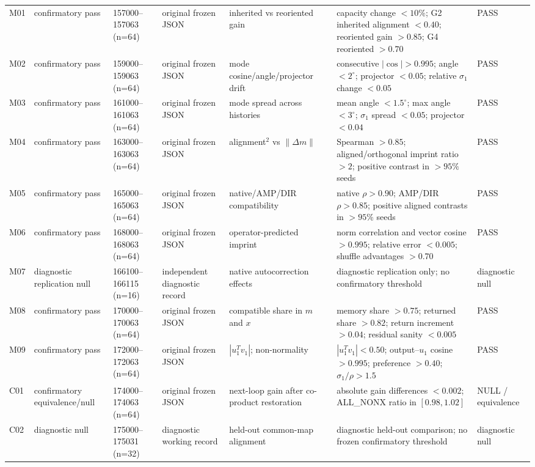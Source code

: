 \documentclass[11pt]{article}
\begin{document}
\begin{landscape}
\begin{longtable}{p{0.65cm}p{2.25cm}p{2.55cm}p{3.15cm}p{3.9cm}p{6.1cm}p{2.2cm}}
M01 & confirmatory pass & 157000--157063 (n=64) & original frozen JSON & inherited vs reoriented gain & capacity change $<10\%$; G2 inherited alignment $<0.40$; reoriented gain $>0.85$; G4 reoriented $>0.70$ & PASS \\
M02 & confirmatory pass & 159000--159063 (n=64) & original frozen JSON & mode cosine/angle/projector drift & consecutive $|\cos|>0.995$; angle $<2^\circ$; projector $<0.05$; relative $\sigma_1$ change $<0.05$ & PASS \\
M03 & confirmatory pass & 161000--161063 (n=64) & original frozen JSON & mode spread across histories & mean angle $<1.5^\circ$; max angle $<3^\circ$; $\sigma_1$ spread $<0.05$; projector $<0.04$ & PASS \\
M04 & confirmatory pass & 163000--163063 (n=64) & original frozen JSON & alignment$^2$ vs $\|\Delta m\|$ & Spearman $>0.85$; aligned/orthogonal imprint ratio $>2$; positive contrast in $>95\%$ seeds & PASS \\
M05 & confirmatory pass & 165000--165063 (n=64) & original frozen JSON & native/AMP/DIR compatibility & native $\rho>0.90$; AMP/DIR $\rho>0.85$; positive aligned contrasts in $>95\%$ seeds & PASS \\
M06 & confirmatory pass & 168000--168063 (n=64) & original frozen JSON & operator-predicted imprint & norm correlation and vector cosine $>0.995$; relative error $<0.005$; shuffle advantages $>0.70$ & PASS \\
M07 & diagnostic replication null & 166100--166115 (n=16) & independent diagnostic record & native autocorrection effects & diagnostic replication only; no confirmatory threshold & diagnostic null \\
M08 & confirmatory pass & 170000--170063 (n=64) & original frozen JSON & compatible share in $m$ and $x$ & memory share $>0.75$; returned share $>0.82$; return increment $>0.04$; residual sanity $<0.005$ & PASS \\
M09 & confirmatory pass & 172000--172063 (n=64) & original frozen JSON & $|u_1^Tv_1|$; non-normality & $|u_1^Tv_1|<0.50$; output--$u_1$ cosine $>0.995$; preference $>0.40$; $\sigma_1/\rho>1.5$ & PASS \\
C01 & confirmatory equivalence/null & 174000--174063 (n=64) & original frozen JSON & next-loop gain after co-product restoration & absolute gain differences $<0.002$; ALL\_NONX ratio in $[0.98,1.02]$ & NULL / equivalence \\
C02 & diagnostic null & 175000--175031 (n=32) & diagnostic working record & held-out common-map alignment & diagnostic held-out comparison; no frozen confirmatory threshold & diagnostic null \\

\end{longtable}
\end{landscape}
\end{document}
